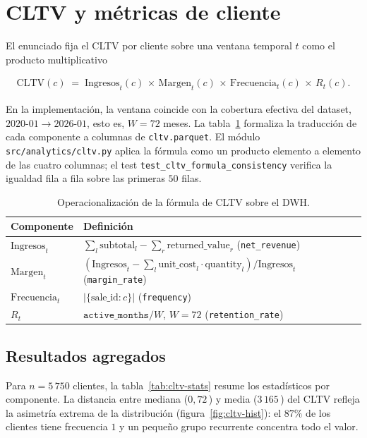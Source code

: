 \section{CLTV y métricas de cliente}
\label{sec:cltv}

El enunciado fija el CLTV por cliente sobre una ventana temporal $t$ como
el producto multiplicativo

\begin{align}
  \mathrm{CLTV}(c)
  \;=\;
  \text{Ingresos}_t(c) \,\times\,
  \text{Margen}_t(c) \,\times\,
  \text{Frecuencia}_t(c) \,\times\,
  R_t(c).
  \label{eq:cltv}
\end{align}

En la implementación, la ventana coincide con la cobertura efectiva del
dataset, $2020\text{-}01 \to 2026\text{-}01$, esto es, $W=72$ meses. La
tabla~\ref{tab:cltv-componentes} formaliza la traducción de cada
componente a columnas de \texttt{cltv.parquet}. El módulo
\texttt{src/analytics/cltv.py} aplica la fórmula como un producto
elemento a elemento de las cuatro columnas; el test
\texttt{test\_cltv\_formula\_consistency} verifica la igualdad fila a
fila sobre las primeras $50$ filas.

\begin{table}[H]
\centering
\caption{Operacionalización de la fórmula de CLTV sobre el DWH.}
\label{tab:cltv-componentes}
\small
\renewcommand{\arraystretch}{1.25}
\begin{tabular}{l p{10.5cm}}
\toprule
\textbf{Componente} & \textbf{Definición} \\
\midrule
$\text{Ingresos}_t$ & $\sum_l \text{subtotal}_l - \sum_r \text{returned\_value}_r$ \;(\texttt{net\_revenue}) \\
$\text{Margen}_t$   & $(\text{Ingresos}_t - \sum_l \text{unit\_cost}_l\cdot\text{quantity}_l)/\text{Ingresos}_t$ \;(\texttt{margin\_rate}) \\
$\text{Frecuencia}_t$ & $|\{\text{sale\_id}:c\}|$ \;(\texttt{frequency}) \\
$R_t$               & $\texttt{active\_months}/W$, $W=72$ \;(\texttt{retention\_rate}) \\
\bottomrule
\end{tabular}
\end{table}

\subsection*{Resultados agregados}

Para $n=5\,750$ clientes, la tabla~\ref{tab:cltv-stats} resume los
estadísticos por componente. La distancia entre mediana ($0{,}72$\,\texteuro)
y media ($3\,165$\,\texteuro) del CLTV refleja la asimetría extrema de la
distribución (figura~\ref{fig:cltv-hist}): el $87\%$ de los clientes tiene
frecuencia $1$ y un pequeño grupo recurrente concentra todo el valor.

